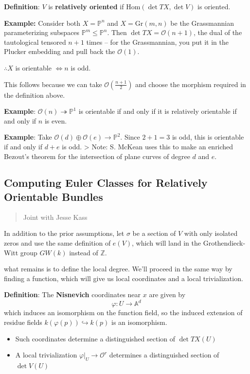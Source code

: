 \documentclass[11pt]{scrreprt}
\theoremstyle{definition}
\providecommand{\tightlist}{%
  \setlength{\itemsep}{0pt}\setlength{\parskip}{0pt}}
\newcommand{\ZZ}[0]{{\mathbb{Z}}}
\newcommand{\PP}[0]{{\mathbb{P}}}
\newcommand{\Af}[0]{{\mathbb{A}}}
\newcommand{\Gr}[0]{{\text{Gr}}}
\newcommand{\OO}[0]{{\mathcal{O}}}
\newcommand{\restrictionof}[2]{{\left.{#1}\right|_{#2}}}
\newcommand{\surjects}[0]{\twoheadrightarrow}
\newcommand{\injects}[0]{\hookrightarrow}
\renewcommand{\hom}[0]{\text{Hom}}
\begin{document}
\textbf{Definition}: \(V\) is \textbf{relatively oriented} if
\(\hom(\det TX, \det V)\) is oriented.

\textbf{Example:} Consider both \(X = \PP^n\) and \(X = \Gr(m,n)\) be
the Grassmannian parameterizing subspaces \(\PP^m \leq \PP^n\). Then
\(\det TX = \mathcal O(n+1)\), the dual of the tautological tensored
\(n+1\) times -- for the Grassmannian, you put it in the Plucker
embedding and pull back the \(\mathcal O(1)\).

\(\therefore X\) is orientable \(\iff n\) is odd.

This follows because we can take \(\mathcal O( \frac{n+1} {2})\) and
choose the morphism required in the definition above.

\textbf{Example}: \(\mathcal O(n) \surjects \PP^1\) is orientable if and
only if it is relatively orientable if and only if \(n\) is even.

\textbf{Example}: Take \(\OO(d)\oplus \OO(e) \to \PP^2\). Since
\(2+1=3\) is odd, this is orientable if and only if \(d+e\) is odd.
\textgreater{} Note: S. McKean uses this to make an enriched Bezout's
theorem for the intersection of plane curves of degree \(d\) and \(e\).

\hypertarget{computing-euler-classes-for-relatively-orientable-bundles}{%
\subsection{Computing Euler Classes for Relatively Orientable
Bundles}\label{computing-euler-classes-for-relatively-orientable-bundles}}

\begin{quote}
Joint with Jesse Kass
\end{quote}

In addition to the prior assumptions, let \(\sigma\) be a section of
\(V\) with only isolated zeros and use the same definition of \(e(V)\),
which will land in the Grothendieck-Witt group \(GW(k)\) instead of
\(\ZZ\).

what remains is to define the local degree. We'll proceed in the same
way by finding a function, which will give us local coordinates and a
local trivialization.

\textbf{Definition}: The \textbf{Nisnevich} coordinates near \(x\) are
given by \[
\varphi: U \to \Af^d
\] which induces an isomorphism on the function field, so the induced
extension of residue fields \(k(\varphi(p)) \injects k(p)\) is an
isomorphism.

\begin{itemize}
\tightlist
\item
  Such coordinates determine a distinguished section of \(\det TX(U)\)
\item
  A local trivialization \(\restrictionof{\varphi}{U} \to \OO^r\)
  determines a distinguished section of \(\det V(U)\)
\end{itemize}
\end{document}
